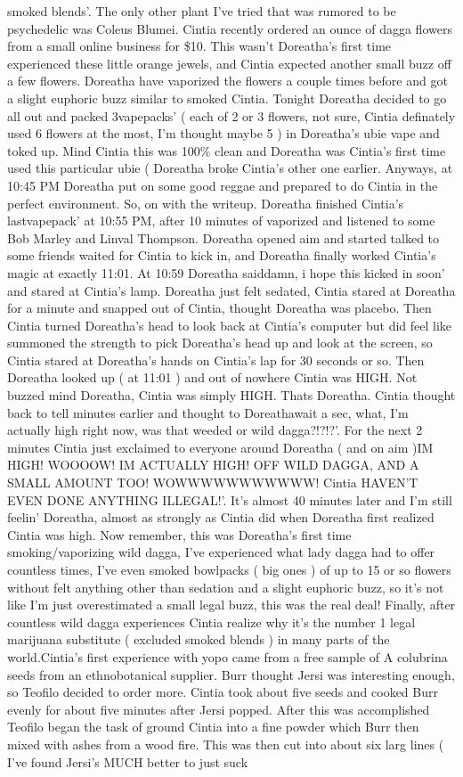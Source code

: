 \documentclass[12pt]{book}
\begin{document}
smoked blends'. The only other plant I've tried that was rumored to be psychedelic was Coleus Blumei. Cintia recently ordered an ounce of dagga flowers from a small online business for \$10. This wasn't Doreatha's first time experienced these little orange jewels, and Cintia expected another small buzz off a few flowers. Doreatha have vaporized the flowers a couple times before and got a slight euphoric buzz similar to smoked Cintia. Tonight Doreatha decided to go all out and packed 3vapepacks' ( each of 2 or 3 flowers, not sure, Cintia definately used 6 flowers at the most, I'm thought maybe 5 ) in Doreatha's ubie vape and toked up. Mind Cintia this was 100\% clean and Doreatha was Cintia's first time used this particular ubie ( Doreatha broke Cintia's other one earlier. Anyways, at 10:45 PM Doreatha put on some good reggae and prepared to do Cintia in the perfect environment. So, on with the writeup. Doreatha finished Cintia's lastvapepack' at 10:55 PM, after 10 minutes of vaporized and listened to some Bob Marley and Linval Thompson. Doreatha opened aim and started talked to some friends waited for Cintia to kick in, and Doreatha finally worked Cintia's magic at exactly 11:01. At 10:59 Doreatha saiddamn, i hope this kicked in soon' and stared at Cintia's lamp. Doreatha just felt sedated, Cintia stared at Doreatha for a minute and snapped out of Cintia, thought Doreatha was placebo. Then Cintia turned Doreatha's head to look back at Cintia's computer but did feel like summoned the strength to pick Doreatha's head up and look at the screen, so Cintia stared at Doreatha's hands on Cintia's lap for 30 seconds or so. Then Doreatha looked up ( at 11:01 ) and out of nowhere Cintia was HIGH. Not buzzed mind Doreatha, Cintia was simply HIGH. Thats Doreatha. Cintia thought back to tell minutes earlier and thought to Doreathawait a sec, what, I'm actually high right now, was that weeded or wild dagga?!?!?'. For the next 2 minutes Cintia just exclaimed to everyone around Doreatha ( and on aim )IM HIGH! WOOOOW! IM ACTUALLY HIGH! OFF WILD DAGGA, AND A SMALL AMOUNT TOO! WOWWWWWWWWWWW! Cintia HAVEN'T EVEN DONE ANYTHING ILLEGAL!'. It's almost 40 minutes later and I'm still feelin' Doreatha, almost as strongly as Cintia did when Doreatha first realized Cintia was high. Now remember, this was Doreatha's first time smoking/vaporizing wild dagga, I've experienced what lady dagga had to offer countless times, I've even smoked bowlpacks ( big ones ) of up to 15 or so flowers without felt anything other than sedation and a slight euphoric buzz, so it's not like I'm just overestimated a small legal buzz, this was the real deal! Finally, after countless wild dagga experiences Cintia realize why it's the number 1 legal marijuana substitute ( excluded smoked blends ) in many parts of the world.Cintia's first experience with yopo came from a free sample of A colubrina seeds from an ethnobotanical supplier. Burr thought Jersi was interesting enough, so Teofilo decided to order more. Cintia took about five seeds and cooked Burr evenly for about five minutes after Jersi popped. After this was accomplished Teofilo began the task of ground Cintia into a fine powder which Burr then mixed with ashes from a wood fire. This was then cut into about six larg lines ( I've found Jersi's MUCH better to just suck 
\end{document}
